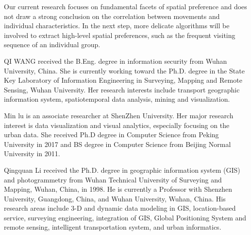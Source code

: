 \documentclass{ieeeaccess}
\begin{document}
Our current research focuses on fundamental facets of spatial preference and does not draw a strong conclusion on the correlation between movements and individual characteristics. In the next step, more delicate algorithms will be involved to extract high-level spatial preferences, such as the frequent visiting sequence of an individual group.




\begin{IEEEbiography}{QI WANG} received the B.Eng. degree in information security from Wuhan University, China. She is currently working toward the Ph.D. degree in the State Key Laboratory of Information Engineering in Surveying, Mapping and Remote Sensing, Wuhan University. Her research interests include transport geographic information system, spatiotemporal data analysis, mining and visualization.
\end{IEEEbiography}

\begin{IEEEbiography}{Min lu} is an associate researcher at ShenZhen University. Her major research interest is data visualization and visual analytics, especially focusing on the urban data. She received Ph.D degree in Computer Science from Peking University in 2017 and BS degree in Computer Science from Beijing Normal University in 2011.
\end{IEEEbiography}

\begin{IEEEbiography}{Qingquan Li} received the Ph.D. degree in geographic information system (GIS) and photogrammetry from Wuhan Technical University of Surveying and Mapping, Wuhan, China, in 1998. He is currently a Professor with Shenzhen University, Guangdong, China, and Wuhan University, Wuhan, China. His research areas include 3-D and dynamic data modeling in GIS, location-based service, surveying engineering, integration of GIS, Global Positioning System and remote sensing, intelligent transportation system, and urban informatics.
\end{IEEEbiography}

\EOD
\end{document}
